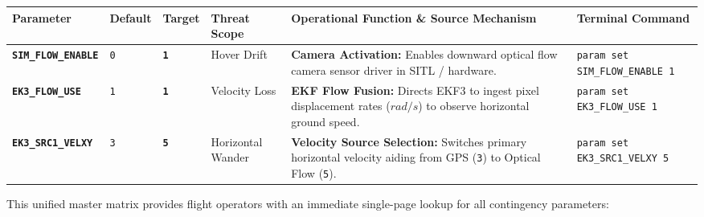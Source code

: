 \documentclass[10pt,letterpaper]{article}
\begin{document}
\noindent
\footnotesize
\renewcommand{\arraystretch}{1.2}
\begin{tabularx}{\textwidth}{L{0.18\textwidth} C{0.07\textwidth} C{0.08\textwidth} L{0.14\textwidth} Y L{0.25\textwidth}}
\toprule
{}
\textbf{Parameter} & \textbf{Default} & \textbf{Target} & \textbf{Threat Scope} & \textbf{Operational Function \& Source Mechanism} & \textbf{Terminal Command} \\
\midrule
\texttt{\bfseries SIM\_FLOW\_ENABLE} & \texttt{0} & \texttt{\bfseries 1} & Hover Drift & 
\textbf{Camera Activation:} Enables downward optical flow camera sensor driver in SITL / hardware. & 
\texttt{\scriptsize\color{cmdgreen}param set SIM\_FLOW\_ENABLE 1} \\
\texttt{\bfseries EK3\_FLOW\_USE} & \texttt{1} & \texttt{\bfseries 1} & Velocity Loss & 
\textbf{EKF Flow Fusion:} Directs EKF3 to ingest pixel displacement rates ($rad/s$) to observe horizontal ground speed. & 
\texttt{\scriptsize\color{cmdgreen}param set EK3\_FLOW\_USE 1} \\
\texttt{\bfseries EK3\_SRC1\_VELXY} & \texttt{3} & \texttt{\bfseries 5} & Horizontal Wander & 
\textbf{Velocity Source Selection:} Switches primary horizontal velocity aiding from GPS (\texttt{3}) to Optical Flow (\texttt{5}). & 
\texttt{\scriptsize\color{cmdgreen}param set EK3\_SRC1\_VELXY 5} \\
\bottomrule
\end{tabularx}

\vspace{3.5mm}

\vspace{1mm}
\noindent
This unified master matrix provides flight operators with an immediate single-page lookup for all contingency parameters:
\end{document}
